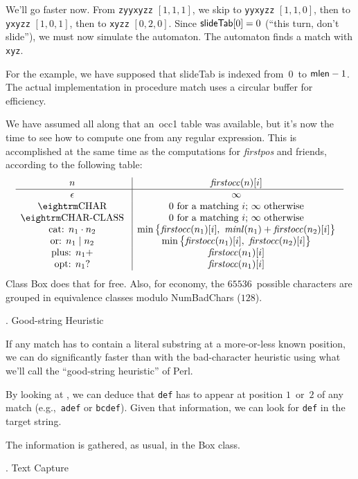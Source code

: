We'll go faster now.  From {\tt zyyxyzz} $[1, 1, 1]$, we skip to {\tt yyxyzz} $[1, 1, 0]$, then to {\tt yxyzz} $[1, 0, 1]$, then to {\tt xyzz} $[0, 2, 0]$.  Since $\hbox{\sf slideTab}[0] = 0$ (``this turn, don't slide''), we must now simulate the automaton.  The automaton finds a match with {\tt xyz}.

For the example, we have supposed that {\sf slideTab} is indexed from~$0$~to $\hbox{\sf mlen} - 1$.  The actual implementation in procedure {\sf match} uses a circular buffer for efficiency.

We have assumed all along that an~{\sf occ1} table was available, but it's now the time to see how to compute one from any regular expression.  This is accomplished at the same time as the computations for {\it firstpos} and friends, according to the following table:  $$\vbox{\halign{\g{#}\vrule && \g{$#$} \cr
  $n$                   & {\it firstocc}(n)[i] \cr
\noalign{\hrule}
  $\epsilon$            & \infty \cr
  \tok{char}            & \hbox{$0$ for a matching $i$; $\infty$ otherwise} \cr
  \tok{char-class}      & \hbox{$0$ for a matching $i$; $\infty$ otherwise} \cr
  cat: $n_1 \cdot n_2$  & \min\smash{\bigl\{}{\it firstocc}(n_1)[i],\ {\it minl}(n_1) + {\it firstocc}(n_2)[i]\smash{\bigr\}} \cr
  or: $n_1 \mid n_2$    & \min\smash{\bigl\{}{\it firstocc}(n_1)[i],\ {\it firstocc}(n_2)[i]\smash{\bigr\}} \cr
  plus: $n_1+$          & {\it firstocc}(n_1)[i] \cr
  opt: $n_1?$           & {\it firstocc}(n_1)[i] \cr
}}$$  Class {\sf Box} does that for free.  Also, for economy, the $65536$~possible characters are grouped in equivalence classes modulo {\sf NumBadChars} ($128$).

. Good-string Heuristic

If any match has to contain a literal substring at a more-or-less known position, we can do significantly faster than with the bad-character heuristic using what we'll call the ``good-string heuristic'' of Perl.

By looking at , we can deduce that {\tt def} has to appear at position $1$~or~$2$ of any match (e.g.,~{\tt adef} or {\tt bcdef}).  Given that information, we can look for {\tt def} in the target string.

The information is gathered, as usual, in the {\sf Box} class.

. Text Capture


